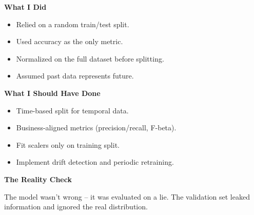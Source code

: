\documentclass[11pt]{article}
\begin{document}
\begin{minipage}[t]{0.45\textwidth}
    {\large\color{brandred}\textbf{What I Did}}

    \begin{itemize}[leftmargin=*, itemsep=0.1in, label={\color{brandred}\textbullet}]
        \item Relied on a random train/test split.
        \item Used accuracy as the only metric.
        \item Normalized on the full dataset before splitting.
        \item Assumed past data represents future.
    \end{itemize}

\end{minipage}
\hfill
\begin{minipage}[t]{0.45\textwidth}

    {\large\color{brandgreen}\textbf{What I Should Have Done}}

    \begin{itemize}[leftmargin=*, itemsep=0.1in, label={\color{brandgreen}\textbullet}]
        \item Time-based split for temporal data.
        \item Business-aligned metrics (precision/recall, F-beta).
        \item Fit scalers only on training split.
        \item Implement drift detection and periodic retraining.
    \end{itemize}

\end{minipage}

\vspace{0.3in}

\begin{darkbox}

{\large\textbf{The Reality Check}}

\vspace{0.05in}

The model wasn't wrong – it was evaluated on a lie. The validation set leaked information and ignored the real distribution.

\end{darkbox}

\vfill
\newpage
\end{document}
